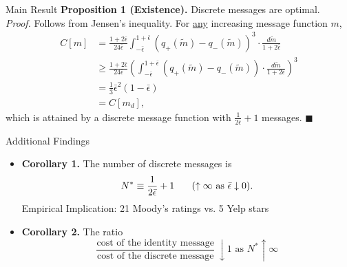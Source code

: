 \documentclass[hyperref={colorlinks=true,linkcolor=blue,citecolor=blue}]{beamer}
\begin{document}
\begin{frame}{Main Result}
\noindent\textbf{Proposition 1 (Existence).} Discrete messages are optimal.\\
\vspace{.25in}
\noindent\textit{Proof.} Follows from Jensen's inequality. For \underline{any} increasing message function $m$, 
\begin{align}
C[m]&=\frac{1+2\bar{\epsilon}}{24\bar{\epsilon}}\int_{-\bar{\epsilon}}^{1+\bar{\epsilon}}{(q_{+}(\tilde{m})-q_{-}(\tilde{m}))^{3}\cdot\frac{d\widetilde{m}}{1+2\bar{\epsilon}}}\\
&\geq\frac{1+2\bar{\epsilon}}{24\bar{\epsilon}}\left(\int_{-\bar{\epsilon}}^{1+\bar{\epsilon}}{(q_{+}(\tilde{m})-q_{-}(\tilde{m}))\cdot\frac{d\widetilde{m}}{1+2\bar{\epsilon}}}\right)^{3}\\
&=\frac{1}{3}\bar{\epsilon}^{2}(1-\bar{\epsilon})\\
&=C[m_{d}],
\end{align}
which is attained by a discrete message function with $\tfrac{1}{2\bar{\epsilon}}+1$ messages. $\blacksquare$
\end{frame}

\begin{frame}{Additional Findings}
\begin{itemize}
\item\textbf{Corollary 1.} The number of discrete messages is 
\begin{equation}
N^{*}\equiv\frac{1}{2\bar{\epsilon}}+1\hspace{.25in}(\uparrow\infty\text{ as }\bar{\epsilon}\downarrow0).
\end{equation}
Empirical Implication: 21 Moody's ratings vs. 5 Yelp stars
\item\textbf{Corollary 2.} The ratio 
\begin{equation}
\frac{\text{cost of the identity message}}{\text{cost of the discrete message}}\:\downarrow 1\text{ as }N^{*}\uparrow\infty
\end{equation}
\end{itemize}
\end{frame}
\end{document}
